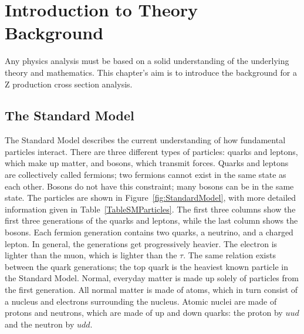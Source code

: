 \chapter{Introduction to Theory Background} 
\label{theory}

Any physics analysis must be based on a 
solid understanding of the 
underlying theory and mathematics.  
This chapter's aim is to introduce 
the background for a Z production 
cross section analysis.  

\section{The Standard Model}
\label{theory:SM}




The Standard Model describes the current understanding 
of how fundamental particles interact.  
There are three different types of particles: 
quarks and leptons, 
which make up matter, 
and bosons, which transmit forces.  
Quarks and leptons are collectively called fermions; 
two fermions cannot exist in the same state as each other.  
Bosons do not have this constraint; 
many bosons can be in the same state.  
The particles are shown in Figure~\ref{fig:StandardModel}, 
with more detailed information given in 
Table~\ref{TableSMParticles}. 
The first three columns show the first three generations 
of the quarks and leptons, 
while the last column shows the bosons.  
Each fermion generation contains two quarks, 
a neutrino, and a charged lepton.  
In general, the generations get progressively heavier.  
The electron is lighter than the muon, 
which is lighter than the $\tau$.   
The same relation exists between the quark generations; 
the top quark is the heaviest known particle in the Standard Model.  %
Normal, everyday matter is made up solely of particles 
from the first generation.  
All normal matter is made of atoms, 
which in turn consist of a nucleus and 
electrons surrounding the nucleus.  
Atomic nuclei are made of protons and neutrons, 
which are made of up and down quarks: 
the proton by $uud$ and the neutron by $udd$.  

